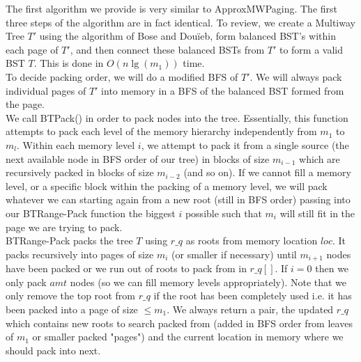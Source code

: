 \documentclass[letterpaper,12pt,titlepage,oneside,final]{book}
\theoremstyle{plain}
\begin{document}
The first algorithm we provide is very similar to ApproxMWPaging. The first three steps of the algorithm are in fact identical. To review, we create a Multiway Tree $T'$ using the algorithm of Bose and Dou\"{i}eb, form balanced BST's within each page of $T'$, and then connect these balanced BSTs from $T'$ to form a valid BST $T$. This is done in $O(n \lg(m_1))$ time. \\

To decide packing order, we will do a modified BFS of $T'$. We will always pack individual pages of $T'$ into memory in a BFS of the balanced BST formed from the page. \\

We call BT\textendash Pack() in order to pack nodes into the tree. Essentially, this function attempts to pack each level of the memory hierarchy independently from $m_1$ to $m_l$. Within each memory level $i$, we attempt to pack it from a single source (the next available node in BFS order of our tree) in blocks of size  $m_{i-1}$ which are recursively packed in blocks of size $m_{i-2}$ (and so on). If we cannot fill a memory level, or a specific block within the packing of a memory level, we will pack whatever we can starting again from a new root (still in BFS order) passing into our BT\textendash Range-Pack function the biggest $i$ possible such that $m_i$ will still fit in the page we are trying to pack. \\

BT\textendash Range-Pack packs the tree $T$ using $r\_q$ as roots from memory location $loc$. It packs recursively into pages of size $m_i$ (or smaller if necessary) until $m_{i+1}$ nodes have been packed or we run out of roots to pack from in $r\_q[]$. If $i=0$ then we only pack $amt$ nodes (so we can fill memory levels appropriately). Note that we only remove the top root from $r\_q$ if the root has been completely used i.e. it has been packed into a page of size $\leq m_1$. We always return a pair, the updated $r\_q$ which contains new roots to search packed from (added in BFS order from leaves of $m_1$ or smaller packed "pages") and the current location in memory where we should pack into next. \\
\end{document}
